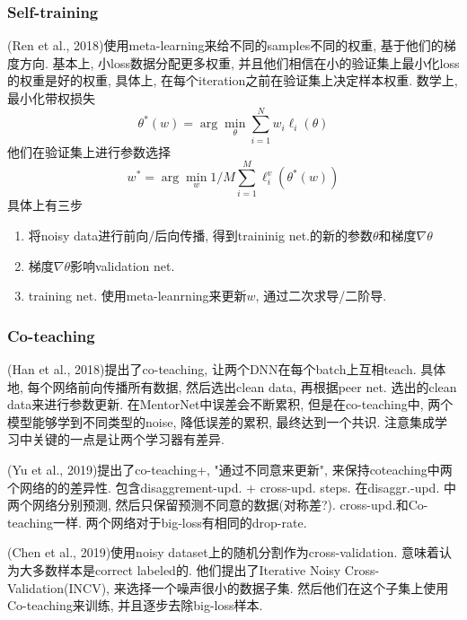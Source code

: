\documentclass{beamer}
\begin{document}
\begin{frame}
    \frametitle{Self-training}

    (Ren et al., 2018)使用meta-learning来给不同的samples不同的权重, 基于他们的梯度方向. 基本上, 小loss数据分配更多权重, 并且他们相信在小的验证集上最小化loss的权重是好的权重, 具体上, 在每个iteration之前在验证集上决定样本权重. 数学上, 最小化带权损失
    \begin{equation}
        \theta^{*}(w)=\arg \min _{\theta} \sum_{i=1}^{N} w_{i} \ell_{i}(\theta)
    \end{equation}  
    他们在验证集上进行参数选择
    \begin{equation}
        w^{*}=\arg \min _{w} 1 / M \sum_{i=1}^{M} \ell_{i}^{v}\left(\theta^{*}(w)\right)
    \end{equation}
    具体上有三步
    \begin{enumerate}
        \item 将noisy data进行前向/后向传播, 得到traininig net.的新的参数$\theta$和梯度$\nabla \theta$
        \item 梯度$\nabla \theta$影响validation net.
        \item training net. 使用meta-leanrning来更新$w$, 通过二次求导/二阶导.
    \end{enumerate}

\end{frame}

\begin{frame}
    \frametitle{Co-teaching}

    (Han et al., 2018)提出了co-teaching, 让两个DNN在每个batch上互相teach. 具体地, 每个网络前向传播所有数据, 然后选出clean data, 再根据peer net. 选出的clean data来进行参数更新. 在MentorNet中误差会不断累积, 但是在co-teaching中, 两个模型能够学到不同类型的noise, 降低误差的累积, 最终达到一个共识. 注意集成学习中关键的一点是让两个学习器有差异.

    (Yu  et  al., 2019)提出了co-teaching+, "通过不同意来更新", 来保持coteaching中两个网络的的差异性. 包含disaggrement-upd. + cross-upd. steps. 在disaggr.-upd. 中两个网络分别预测, 然后只保留预测不同意的数据(对称差?). cross-upd.和Co-teaching一样. 两个网络对于big-loss有相同的drop-rate.

    (Chen et al., 2019)使用noisy dataset上的随机分割作为cross-validation. 意味着认为大多数样本是correct labeled的. 他们提出了Iterative Noisy Cross-Validation(INCV), 来选择一个噪声很小的数据子集. 然后他们在这个子集上使用Co-teaching来训练, 并且逐步去除big-loss样本.

\end{frame}
\end{document}
